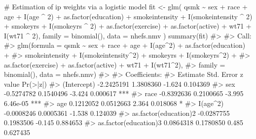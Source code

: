 \documentclass[
  10pt,
  a4paper,
]{book}
\newenvironment{Shaded}{\begin{snugshade}}{\end{snugshade}}
\newcommand{\AttributeTok}[1]{\textcolor[rgb]{0.40,0.45,0.13}{#1}}
\newcommand{\CommentTok}[1]{\textcolor[rgb]{0.37,0.37,0.37}{#1}}
\newcommand{\DecValTok}[1]{\textcolor[rgb]{0.68,0.00,0.00}{#1}}
\newcommand{\FunctionTok}[1]{\textcolor[rgb]{0.28,0.35,0.67}{#1}}
\newcommand{\NormalTok}[1]{\textcolor[rgb]{0.00,0.46,0.62}{#1}}
\newcommand{\OtherTok}[1]{\textcolor[rgb]{0.00,0.46,0.62}{#1}}
\newcommand{\SpecialCharTok}[1]{\textcolor[rgb]{0.37,0.37,0.37}{#1}}
\begin{document}
\begin{Shaded}
\begin{Highlighting}[]
\CommentTok{\# Estimation of ip weights via a logistic model}
\NormalTok{fit }\OtherTok{\textless{}{-}} \FunctionTok{glm}\NormalTok{(}
\NormalTok{  qsmk }\SpecialCharTok{\textasciitilde{}}\NormalTok{ sex }\SpecialCharTok{+}\NormalTok{ race }\SpecialCharTok{+}\NormalTok{ age }\SpecialCharTok{+} \FunctionTok{I}\NormalTok{(age }\SpecialCharTok{\^{}} \DecValTok{2}\NormalTok{) }\SpecialCharTok{+}
    \FunctionTok{as.factor}\NormalTok{(education) }\SpecialCharTok{+}\NormalTok{ smokeintensity }\SpecialCharTok{+}
    \FunctionTok{I}\NormalTok{(smokeintensity }\SpecialCharTok{\^{}} \DecValTok{2}\NormalTok{) }\SpecialCharTok{+}\NormalTok{ smokeyrs }\SpecialCharTok{+} \FunctionTok{I}\NormalTok{(smokeyrs }\SpecialCharTok{\^{}} \DecValTok{2}\NormalTok{) }\SpecialCharTok{+}
    \FunctionTok{as.factor}\NormalTok{(exercise) }\SpecialCharTok{+} \FunctionTok{as.factor}\NormalTok{(active) }\SpecialCharTok{+}\NormalTok{ wt71 }\SpecialCharTok{+} \FunctionTok{I}\NormalTok{(wt71 }\SpecialCharTok{\^{}} \DecValTok{2}\NormalTok{),}
  \AttributeTok{family =} \FunctionTok{binomial}\NormalTok{(),}
  \AttributeTok{data =}\NormalTok{ nhefs.nmv}
\NormalTok{)}
\FunctionTok{summary}\NormalTok{(fit)}
\CommentTok{\#\textgreater{} }
\CommentTok{\#\textgreater{} Call:}
\CommentTok{\#\textgreater{} glm(formula = qsmk \textasciitilde{} sex + race + age + I(age\^{}2) + as.factor(education) + }
\CommentTok{\#\textgreater{}     smokeintensity + I(smokeintensity\^{}2) + smokeyrs + I(smokeyrs\^{}2) + }
\CommentTok{\#\textgreater{}     as.factor(exercise) + as.factor(active) + wt71 + I(wt71\^{}2), }
\CommentTok{\#\textgreater{}     family = binomial(), data = nhefs.nmv)}
\CommentTok{\#\textgreater{} }
\CommentTok{\#\textgreater{} Coefficients:}
\CommentTok{\#\textgreater{}                         Estimate Std. Error z value Pr(\textgreater{}|z|)    }
\CommentTok{\#\textgreater{} (Intercept)           {-}2.2425191  1.3808360  {-}1.624 0.104369    }
\CommentTok{\#\textgreater{} sex                   {-}0.5274782  0.1540496  {-}3.424 0.000617 ***}
\CommentTok{\#\textgreater{} race                  {-}0.8392636  0.2100665  {-}3.995 6.46e{-}05 ***}
\CommentTok{\#\textgreater{} age                    0.1212052  0.0512663   2.364 0.018068 *  }
\CommentTok{\#\textgreater{} I(age\^{}2)              {-}0.0008246  0.0005361  {-}1.538 0.124039    }
\CommentTok{\#\textgreater{} as.factor(education)2 {-}0.0287755  0.1983506  {-}0.145 0.884653    }
\CommentTok{\#\textgreater{} as.factor(education)3  0.0864318  0.1780850   0.485 0.627435    }

\end{Highlighting}
\end{Shaded}
\end{document}
